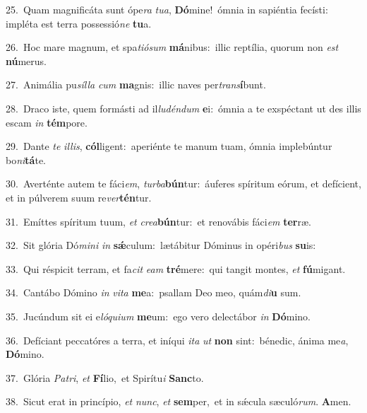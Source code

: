 {\numbfont\textcolor{\numbcolor}{25.}}~Quam magnificáta sunt ópe\textit{ra} \textit{tu}\-\textit{a}, \textbf{Dó}\-mine!~\star ómnia in sapiéntia fecísti: impléta est terra possessió\textit{ne} \textbf{tu}\-a.\par
{\numbfont\textcolor{\numbcolor}{26.}}~Hoc mare magnum, et spa\-\textit{ti}\-\textit{ó}\textit{sum} \textbf{má}\-nibus:~\star illic reptília, quorum non \textit{est} \textbf{nú}\-merus.\par
{\numbfont\textcolor{\numbcolor}{27.}}~Animália pu\-\textit{síl}\-\textit{la} \textit{cum} \textbf{ma}\-gnis:~\star illic naves per\-\textit{trans}\-\textbf{í}bunt.\par
{\numbfont\textcolor{\numbcolor}{28.}}~Draco iste, quem formásti ad il\-\textit{lu}\-\textit{dén}\textit{dum} \textbf{e}\-i:~\star ómnia a te exspéctant ut des illis escam \textit{in} \textbf{tém}\-pore.\par
{\numbfont\textcolor{\numbcolor}{29.}}~Dante \textit{te} \textit{il}\-\textit{lis}, \textbf{cól}\-ligent:~\star aperiénte te manum tuam, ómnia implebúntur bo\-\textit{ni}\-\textbf{tá}te.\par
{\numbfont\textcolor{\numbcolor}{30.}}~Averténte autem te fáci\-\textit{em}\-, \textit{tur}\-\textit{ba}\textbf{bún}tur:~\star áuferes spíritum eórum, et defícient, et in púlverem suum re\-\textit{ver}\-\textbf{tén}tur.\par
{\numbfont\textcolor{\numbcolor}{31.}}~Emíttes spíritum tuum, \textit{et} \textit{cre}\-\textit{a}\textbf{bún}tur:~\star et renovábis fáci\textit{em} \textbf{ter}\-ræ.\par
{\numbfont\textcolor{\numbcolor}{32.}}~Sit glória Dó\-\textit{mi}\-\textit{ni} \textit{in} \textbf{sǽ}\-culum:~\star lætábitur Dóminus in opéri\textit{bus} \textbf{su}\-is:\par
{\numbfont\textcolor{\numbcolor}{33.}}~Qui réspicit terram, et fa\textit{cit} \textit{e}\-\textit{am} \textbf{tré}\-mere:~\star qui tangit montes, \textit{et} \textbf{fú}\-migant.\par
{\numbfont\textcolor{\numbcolor}{34.}}~Cantábo Dómino \textit{in} \textit{vi}\-\textit{ta} \textbf{me}\-a:~\star psallam Deo meo, quám\-\textit{di}\-\textbf{u} sum.\par
{\numbfont\textcolor{\numbcolor}{35.}}~Jucúndum sit ei e\-\textit{ló}\-\textit{qui}\textit{um} \textbf{me}\-um:~\star ego vero delectábor \textit{in} \textbf{Dó}\-mino.\par
{\numbfont\textcolor{\numbcolor}{36.}}~Defíciant peccatóres a terra, et iníqui \textit{i}\-\textit{ta} \textit{ut} \textbf{non} sint:~\star bénedic, ánima me\-\textit{a}\-, \textbf{Dó}\-mino.\par
{\numbfont\textcolor{\numbcolor}{37.}}~Glória \textit{Pa}\-\textit{tri}, \textit{et} \textbf{Fí}\-lio,~\star et Spirítu\textit{i} \textbf{Sanc}\-to.\par
{\numbfont\textcolor{\numbcolor}{38.}}~Sicut erat in princípio, \textit{et} \textit{nunc}\-, \textit{et} \textbf{sem}\-per,~\star et in sǽcula sæculó\-\textit{rum}\-. \textbf{A}\-men.\par
